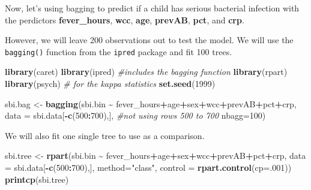 \documentclass[
]{book}
\newenvironment{Shaded}{\begin{snugshade}}{\end{snugshade}}
\newcommand{\AttributeTok}[1]{\textcolor[rgb]{0.13,0.29,0.53}{#1}}
\newcommand{\CommentTok}[1]{\textcolor[rgb]{0.56,0.35,0.01}{\textit{#1}}}
\newcommand{\DecValTok}[1]{\textcolor[rgb]{0.00,0.00,0.81}{#1}}
\newcommand{\FunctionTok}[1]{\textcolor[rgb]{0.13,0.29,0.53}{\textbf{#1}}}
\newcommand{\NormalTok}[1]{#1}
\newcommand{\OtherTok}[1]{\textcolor[rgb]{0.56,0.35,0.01}{#1}}
\newcommand{\SpecialCharTok}[1]{\textcolor[rgb]{0.81,0.36,0.00}{\textbf{#1}}}
\newcommand{\StringTok}[1]{\textcolor[rgb]{0.31,0.60,0.02}{#1}}
\begin{document}
Now, let's using bagging to predict if a child has serious bacterial
infection with the perdictors \textbf{fever\_hours}, \textbf{wcc}, \textbf{age}, \textbf{prevAB},
\textbf{pct}, and \textbf{crp}.

However, we will leave 200 observations out to test the model. We will
use the \texttt{bagging()} function from the \texttt{ipred} package and fit 100 trees.

\begin{Shaded}
\begin{Highlighting}[]
\FunctionTok{library}\NormalTok{(caret)}
\FunctionTok{library}\NormalTok{(ipred)  }\CommentTok{\#includes the bagging function }
\FunctionTok{library}\NormalTok{(rpart)}
\FunctionTok{library}\NormalTok{(psych) }\CommentTok{\# for the kappa statistics}
\FunctionTok{set.seed}\NormalTok{(}\DecValTok{1999}\NormalTok{)}

\NormalTok{sbi.bag }\OtherTok{\textless{}{-}} \FunctionTok{bagging}\NormalTok{(sbi.bin }\SpecialCharTok{\textasciitilde{}}\NormalTok{ fever\_hours}\SpecialCharTok{+}\NormalTok{age}\SpecialCharTok{+}\NormalTok{sex}\SpecialCharTok{+}\NormalTok{wcc}\SpecialCharTok{+}\NormalTok{prevAB}\SpecialCharTok{+}\NormalTok{pct}\SpecialCharTok{+}\NormalTok{crp,}
                  \AttributeTok{data =}\NormalTok{ sbi.data[}\SpecialCharTok{{-}}\FunctionTok{c}\NormalTok{(}\DecValTok{500}\SpecialCharTok{:}\DecValTok{700}\NormalTok{),],      }\CommentTok{\#not using rows 500 to 700}
                  \AttributeTok{nbagg=}\DecValTok{100}\NormalTok{)}
\end{Highlighting}
\end{Shaded}

We will also fit one single tree to use as a comparison.

\begin{Shaded}
\begin{Highlighting}[]
\NormalTok{sbi.tree }\OtherTok{\textless{}{-}} \FunctionTok{rpart}\NormalTok{(sbi.bin }\SpecialCharTok{\textasciitilde{}}\NormalTok{ fever\_hours}\SpecialCharTok{+}\NormalTok{age}\SpecialCharTok{+}\NormalTok{sex}\SpecialCharTok{+}\NormalTok{wcc}\SpecialCharTok{+}\NormalTok{prevAB}\SpecialCharTok{+}\NormalTok{pct}\SpecialCharTok{+}\NormalTok{crp,}
                  \AttributeTok{data =}\NormalTok{ sbi.data[}\SpecialCharTok{{-}}\FunctionTok{c}\NormalTok{(}\DecValTok{500}\SpecialCharTok{:}\DecValTok{700}\NormalTok{),], }\AttributeTok{method=}\StringTok{"class"}\NormalTok{, }
                  \AttributeTok{control =} \FunctionTok{rpart.control}\NormalTok{(}\AttributeTok{cp=}\NormalTok{.}\DecValTok{001}\NormalTok{))}
\FunctionTok{printcp}\NormalTok{(sbi.tree)}
\end{Highlighting}
\end{Shaded}
\end{document}
